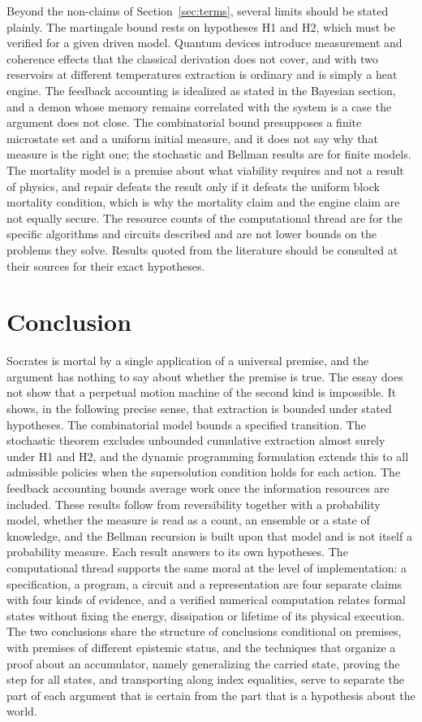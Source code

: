 \documentclass[11pt]{article}
\theoremstyle{definition}
\theoremstyle{remark}
\begin{document}
Beyond the non-claims of Section~\ref{sec:terms}, several limits should be stated plainly. The martingale bound rests on hypotheses H1 and H2, which must be verified for a given driven model. Quantum devices introduce measurement and coherence effects that the classical derivation does not cover, and with two reservoirs at different temperatures extraction is ordinary and is simply a heat engine. The feedback accounting is idealized as stated in the Bayesian section, and a demon whose memory remains correlated with the system is a case the argument does not close. The combinatorial bound presupposes a finite microstate set and a uniform initial measure, and it does not say why that measure is the right one; the stochastic and Bellman results are for finite models. The mortality model is a premise about what viability requires and not a result of physics, and repair defeats the result only if it defeats the uniform block mortality condition, which is why the mortality claim and the engine claim are not equally secure. The resource counts of the computational thread are for the specific algorithms and circuits described and are not lower bounds on the problems they solve. Results quoted from the literature should be consulted at their sources for their exact hypotheses.

\section{Conclusion}

Socrates is mortal by a single application of a universal premise, and the argument has nothing to say about whether the premise is true. The essay does not show that a perpetual motion machine of the second kind is impossible. It shows, in the following precise sense, that extraction is bounded under stated hypotheses. The combinatorial model bounds a specified transition. The stochastic theorem excludes unbounded cumulative extraction almost surely under H1 and H2, and the dynamic programming formulation extends this to all admissible policies when the supersolution condition holds for each action. The feedback accounting bounds average work once the information resources are included. These results follow from reversibility together with a probability model, whether the measure is read as a count, an ensemble or a state of knowledge, and the Bellman recursion is built upon that model and is not itself a probability measure. Each result answers to its own hypotheses. The computational thread supports the same moral at the level of implementation: a specification, a program, a circuit and a representation are four separate claims with four kinds of evidence, and a verified numerical computation relates formal states without fixing the energy, dissipation or lifetime of its physical execution. The two conclusions share the structure of conclusions conditional on premises, with premises of different epistemic status, and the techniques that organize a proof about an accumulator, namely generalizing the carried state, proving the step for all states, and transporting along index equalities, serve to separate the part of each argument that is certain from the part that is a hypothesis about the world.
\end{document}
